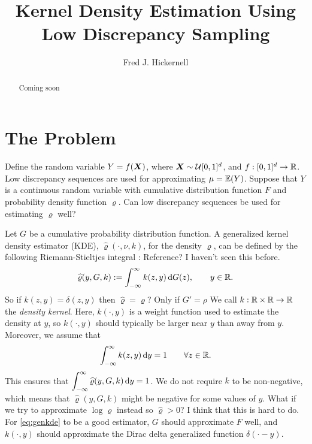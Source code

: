 \documentclass[letterpaper]{amsart}
\newcommand{\hvarrho}{\widehat{\varrho}}
\newcommand{\AGSNote}[1]{{\color{cyan} #1}}
\newcommand{\FJHNote}[1]{{\color{blue} #1}}
\begin{document}
\title{Kernel Density Estimation Using Low Discrepancy Sampling}
\author{Fred J. Hickernell}
\begin{abstract} Coming soon
\end{abstract}

\maketitle

\section{The Problem} \label{sec:problem}

Define the random variable $Y = f(\boldsymbol{X})$, where $\boldsymbol{X} \sim \mathcal{U}[0,1]^d$, and $f:[0,1]^d \to \mathbb{R}$.  Low discrepancy sequences are used for approximating  $\mu = \operatorname{\mathbb{E}}(Y)$.  Suppose that $Y$ is a continuous random variable with cumulative distribution function $F$ and probability density function $\varrho$.  Can low discrepancy sequences be used for estimating $\varrho$ well?

Let $G$ be a cumulative probability distribution function.  A generalized kernel density estimator (KDE), $\hvarrho(\cdot,\nu,k)$, for the density $\varrho$, can be defined by the following Riemann-Stieltjes integral \cite{RSIntegral}: \AGSNote{Reference? I haven't seen this before. }
\begin{equation}
	\label{eq:genkde}
\hvarrho(y,G,k) := \int_{-\infty}^{\infty} k(z,y) \, \dif G(z), \qquad y \in \reals.
\end{equation}
\AGSNote{So if $k(z,y) = \delta(z,y)$ then $\hat{\varrho} = \varrho$?} \FJHNote{Only if $G'=\rho$} We call $k:\mathbb{R} \times \mathbb{R} \to \mathbb{R}$ the \emph{density kernel}. Here, $k(\cdot,y)$ is a weight function used to estimate the density at $y$, so $k(\cdot,y)$ should typically be larger near $y$ than away from $y$.   Moreover, we assume that
\begin{equation}
	\label{eq:kintegral}
	\int_{-\infty}^{\infty} k(z,y) \, {\rm d} y = 1 \qquad \forall z \in \mathbb{R}.
\end{equation}
This ensures that $\displaystyle \int_{-\infty}^{\infty} \hvarrho(y,G,k) \, \dif y = 1$.  We do not require $k$ to be non-negative, which means that $\hvarrho(y,G,k)$ might be negative for some values of $y$. \AGSNote{What if we try to approximate $\log \varrho$ instead so  $\hat{\varrho} > 0$?} \FJHNote{I think that this is hard to do.} For \eqref{eq:genkde} to be a good estimator, $G$ should approximate $F$ well, and $k(\cdot,y)$ should approximate the Dirac delta generalized function $\delta(\cdot - y)$.
\end{document}
